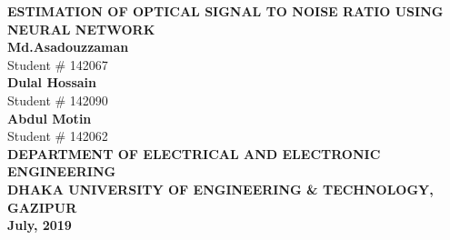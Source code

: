 \documentclass[12pt]{report}
\begin{document}
	\begin{titlepage}
		\begin{center}
			\LARGE {\bfseries {ESTIMATION OF OPTICAL SIGNAL TO NOISE RATIO USING NEURAL NETWORK}}\\
			\vspace{5cm}
			{\normalsize 
				\textbf{Md.Asadouzzaman}\\
				Student \# 142067\\
				\textbf{Dulal Hossain}\\
				Student \# 142090\\
				\textbf{Abdul Motin}\\
				Student \# 142062\\}
			\vspace{10cm}
			{\fontsize{12}{0} \bfseries {DEPARTMENT OF ELECTRICAL AND ELECTRONIC ENGINEERING}}\\
			{\fontsize{13}{0} \bfseries {DHAKA UNIVERSITY OF ENGINEERING \& TECHNOLOGY, GAZIPUR}}\\
			{\fontsize{12}{0} \textbf{July, 2019}}
		\end{center}
	\end{titlepage}
\end{document}
